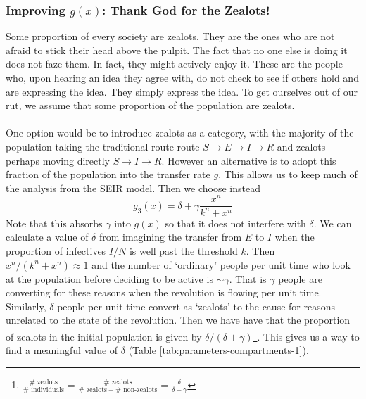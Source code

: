 \subsubsection{Improving $g(x)$: Thank God for the Zealots!}\label{sssec:zealots}
Some proportion of every society are zealots. They are the ones who are not afraid to stick their head above the pulpit. The fact that no one else is doing it does not faze them. In fact, they might actively enjoy it. These are the people who, upon hearing an idea they agree with, do not check to see if others hold and are expressing the idea. They simply express the idea. To get ourselves out of our rut, we assume that some proportion of the population are zealots.\\
\\
One option would be to introduce zealots as a category, with the majority of the population taking the traditional route route $S\rightarrow E\rightarrow I\rightarrow R$ and zealots perhaps moving directly $S\rightarrow I\rightarrow R$. However an alternative is to adopt this fraction of the population into the transfer rate $g$. This allows us to keep much of the analysis from the SEIR model.
\label{mmd}
Then we choose instead \[g_3(x)=\delta+\gamma\frac{x^n}{k^n + x^n}\]
Note that this absorbs $\gamma$ into $g(x)$ so that it does not interfere with $\delta$. We can calculate a value of $\delta$ from imagining the transfer from $E$ to $I$ when the proportion of infectives $I/N$ is well past the threshold $k$. Then ${x^n}/({k^n + x^n})\approx1$ and the number of `ordinary' people per unit time who look at the population before deciding to be active is $\sim\gamma$. That is $\gamma$ people are converting for these reasons when the revolution is flowing per unit time. Similarly, $\delta$ people per unit time convert as `zealots' to the cause for reasons unrelated to the state of the revolution. Then we have have that the proportion of zealots in the initial population is given by $\delta/{(\delta+\gamma)}$\footnote{$\frac{\# \text{ zealots}}{\# \text{ individuals}}=\frac{\# \text{ zealots}}{\# \text{ zealots}+\# \text{ non-zealots}}=\frac{\delta}{\delta+\gamma}
$
}.
This gives us a way to find a meaningful value of $\delta$ (Table \ref{tab:parameters-compartments-1}).\\
